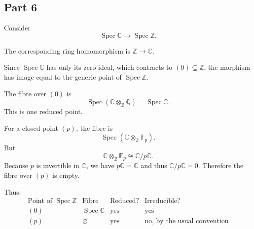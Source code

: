 \subsection{Part 6}

Consider
\[
\operatorname{Spec}\mathbb{C}
\longrightarrow
\operatorname{Spec}\mathbb{Z}.
\]

The corresponding ring homomorphism is \(\mathbb Z\to\mathbb C\).

Since \(\operatorname{Spec}\mathbb C\) has only its zero ideal, which contracts to \((0)\subseteq\mathbb Z\), the morphism has image equal to the generic point of \(\operatorname{Spec}\mathbb Z\).

The fibre over \((0)\) is
\[
\operatorname{Spec}
\left(
\mathbb{C}\otimes_{\mathbb{Z}}\mathbb{Q}
\right)
=
\operatorname{Spec}\mathbb{C}.
\]
This is one reduced point.

For a closed point \((p)\), the fibre is
\[
\operatorname{Spec}
\left(
\mathbb{C}\otimes_{\mathbb{Z}}\mathbb{F}_p
\right).
\]
But
\[
\mathbb{C}\otimes_{\mathbb{Z}}\mathbb{F}_p
\cong
\mathbb{C}/p\mathbb{C}.
\]
Because \(p\) is invertible in \(\mathbb C\), we have \(p\mathbb C=\mathbb C\) and thus \(\mathbb C/p\mathbb C=0\). Therefore the fibre over \((p)\) is empty.

Thus:
\[
\begin{array}{c|c|c|c}
	\text{Point of }\operatorname{Spec}\mathbb{Z}
	&
	\text{Fibre}
	&
	\text{Reduced?}
	&
	\text{Irreducible?}
	\\
	\hline
	(0)
	&
	\operatorname{Spec}\mathbb{C}
	&
	\text{yes}
	&
	\text{yes}
	\\
	(p)
	&
	\varnothing
	&
	\text{yes}
	&
	\text{no, by the usual convention}
\end{array}
\]

